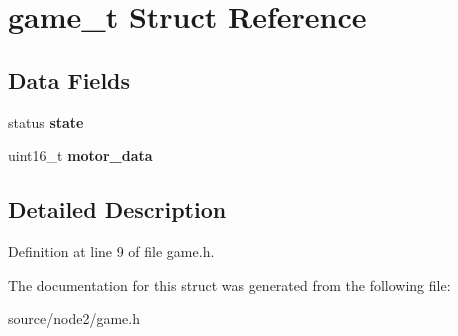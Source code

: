 \hypertarget{structgame__t}{}\section{game\+\_\+t Struct Reference}
\label{structgame__t}
\subsection*{Data Fields}
\begin{DoxyCompactItemize}
\item 
\mbox{\label{structgame__t_a8466b773cadd5360da7032bc2b081ba6}} 
status {\bfseries state}
\item 
\mbox{\label{structgame__t_a3edcbda8f7ffffa9cda6a1a1ee9adec5}} 
uint16\+\_\+t {\bfseries motor\+\_\+data}
\end{DoxyCompactItemize}


\subsection{Detailed Description}


Definition at line 9 of file game.\+h.



The documentation for this struct was generated from the following file\+:\begin{DoxyCompactItemize}
\item 
source/node2/game.\+h\end{DoxyCompactItemize}
